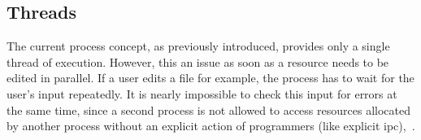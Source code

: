 \subsection{Threads}\label{sec:threads}


%
%
%
%
%

The current process concept, as previously introduced, provides only a single thread of execution.
However, this an issue as soon as a resource needs to be edited in parallel.
If a user edits a file for example, the process has to wait for the user's input repeatedly. 
It is nearly impossible to check this input for errors at the same time, since a second process is not allowed to access resources allocated by another process without an explicit action of programmers (like explicit \acl{ipc})\cite{tanenbaum-modern-operating-systems},~\cite{brause2017betriebssysteme}.

